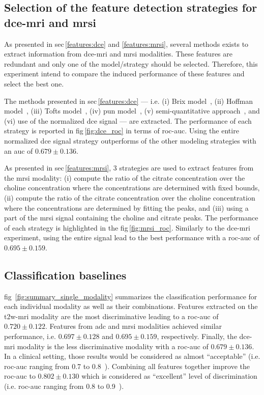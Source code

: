 \documentclass[final,3p,times,twocolumn]{elsarticle}
\begin{document}
\subsection{Selection of the feature detection strategies for
  \ac{dce}-\ac{mri} and \ac{mrsi}}\label{exp:dce_mrsi_sel}

As presented in \acs{sec}\,\ref{features:dce} and \ref{features:mrsi}, several
methods exists to extract information from \ac{dce}-\ac{mri} and \ac{mrsi}
modalities. These features are redundant and only one of the model/strategy
should be selected. Therefore, this experiment intend to compare the
induced performance of these features and select the best one.

The methods presented in \acs{sec}\,\ref{features:dce} --- i.e. (i) Brix
model~\cite{brix1991pharmacokinetic}, (ii) Hoffman
model~\cite{hoffmann1995pharmacokinetic}, (iii) Tofts
model~\cite{tofts1995quantitative}, (iv) \ac{pun}
model~\cite{gliozzi2011phenomenological}, (v) semi-quantitative
approach~\cite{huisman2001accurate}, and (vi) use of the normalized \ac{dce}
signal --- are extracted. The performance of each strategy is reported in
\acs{fig}\,\ref{fig:dce_roc} in terms of \ac{roc}-\ac{auc}. Using the entire
normalized \ac{dce} signal strategy outperforms of the other modeling
strategies with an \ac{auc} of $0.679 \pm 0.136$.

As presented in \acs{sec}\,\ref{features:mrsi}, 3 strategies are used to
extract features from the \ac{mrsi} modality: (i) compute the ratio of the
citrate concentration over the choline concentration where the concentrations
are determined with fixed \si{\ppm} bounds, (ii) compute the ratio of the
citrate concentration over the choline concentration where the concentrations
are determined by fitting the peaks, and (iii) using a part of the \ac{mrsi}
signal containing the choline and citrate peaks. The performance of each
strategy is highlighted in the \acs{fig}\,\ref{fig:mrsi_roc}. Similarly to the
\ac{dce}-\ac{mri} experiment, using the entire signal lead to the best
performance with a \ac{roc}-\ac{auc} of $0.695 \pm 0.159$.

\subsection{Classification baselines}

\Acl{fig}~\ref{fig:summary_single_modality} summarizes the classification
performance for each individual modality as well as their
combinations. Features extracted on the \ac{t2w}-\ac{mri} modality are the most
discriminative leading to a \ac{roc}-\ac{auc} of $0.720 \pm 0.122$. Features
from \ac{adc} and \ac{mrsi} modalities achieved similar performance,
i.e. $0.697 \pm 0.128$ and $0.695 \pm 0.159$, respectively. Finally, the
\ac{dce}-\ac{mri} modality is the less discriminative modality with a
\ac{roc}-\ac{auc} of $0.679 \pm 0.136$. In a clinical setting, those results
would be considered as almost ``acceptable'' (i.e. \ac{roc}-\ac{auc} ranging
from 0.7 to 0.8~\cite{hosmer2004applied}). Combining all features together
improve the \ac{roc}-\ac{auc} to $0.802 \pm 0.130$ which is considered as
``excellent'' level of discrimination (i.e. \ac{roc}-\ac{auc} ranging
from 0.8 to 0.9~\cite{hosmer2004applied}).
\end{document}
